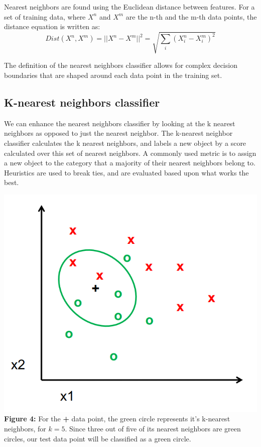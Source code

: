 \documentclass{article}
\begin{document}
Nearest neighbors are found using the Euclidean distance between features. For a set of training data, where $X^n$ and $X^m$ are the n-th and the m-th data points, the distance equation is written as:
\begin{equation}
Dist(X^n, X^m) = ||X^n - X^m||^2 = \sqrt{\sum_{i}(X^n_i - X^m_i)^2}
\end{equation}

The definition of the nearest neighbors classifier allows for complex decision boundaries that are shaped around each data point in the training set. \\

\subsection{K-nearest neighbors classifier}
We can enhance the nearest neighbors classifier by looking at the k nearest neighbors as opposed to just the nearest neighbor. The k-nearest neighbor classifier calculates the k nearest neighbors, and labels a new object by a score calculated over this set of nearest neighbors. A commonly used metric is to assign a new object to the category that a majority of their nearest neighbors belong to. Heuristics are used to break ties, and are evaluated based upon what works the best. \\

\begin{center}
	\includegraphics[scale=0.35]{knearestneighbors.png}\\
    \textbf{Figure 4:} For the \textbf{+} data point, the green circle represents it's k-nearest neighbors, for $k=5$. Since three out of five of its nearest neighbors are green circles, our test data point will be classified as a green circle. \cite{lecture11} \\
\end{center}
\end{document}
